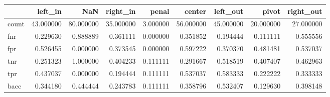 \begin{tabular}{lrrrrrrrr}
\toprule
{} &    left\_in &        NaN &   right\_in &     penal &     center &   left\_out &      pivot &  right\_out \\
\midrule
count &  43.000000 &  80.000000 &  35.000000 &  3.000000 &  56.000000 &  45.000000 &  20.000000 &  27.000000 \\
fnr   &   0.229630 &   0.888889 &   0.361111 &  0.000000 &   0.351852 &   0.194444 &   0.111111 &   0.555556 \\
fpr   &   0.526455 &   0.000000 &   0.373545 &  0.000000 &   0.597222 &   0.370370 &   0.481481 &   0.537037 \\
tnr   &   0.251323 &   1.000000 &   0.404233 &  0.111111 &   0.291667 &   0.518519 &   0.407407 &   0.462963 \\
tpr   &   0.437037 &   0.000000 &   0.194444 &  0.111111 &   0.537037 &   0.583333 &   0.222222 &   0.333333 \\
bacc  &   0.344180 &   0.444444 &   0.243783 &  0.111111 &   0.358796 &   0.532407 &   0.129630 &   0.398148 \\
\bottomrule
\end{tabular}
